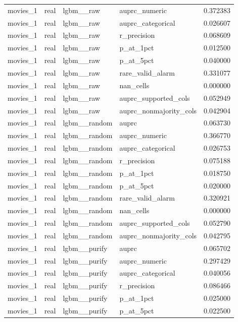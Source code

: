 \begin{tabular}{lllll}
movies\_1 & real & lgbm\_\_raw & auprc\_numeric & 0.372383 \\
movies\_1 & real & lgbm\_\_raw & auprc\_categorical & 0.026607 \\
movies\_1 & real & lgbm\_\_raw & r\_precision & 0.068609 \\
movies\_1 & real & lgbm\_\_raw & p\_at\_1pct & 0.012500 \\
movies\_1 & real & lgbm\_\_raw & p\_at\_5pct & 0.040000 \\
movies\_1 & real & lgbm\_\_raw & rare\_valid\_alarm & 0.331077 \\
movies\_1 & real & lgbm\_\_raw & nan\_cells & 0.000000 \\
movies\_1 & real & lgbm\_\_raw & auprc\_supported\_cols & 0.052949 \\
movies\_1 & real & lgbm\_\_raw & auprc\_nonmajority\_cols & 0.042904 \\
movies\_1 & real & lgbm\_\_random & auprc & 0.063730 \\
movies\_1 & real & lgbm\_\_random & auprc\_numeric & 0.366770 \\
movies\_1 & real & lgbm\_\_random & auprc\_categorical & 0.026753 \\
movies\_1 & real & lgbm\_\_random & r\_precision & 0.075188 \\
movies\_1 & real & lgbm\_\_random & p\_at\_1pct & 0.018750 \\
movies\_1 & real & lgbm\_\_random & p\_at\_5pct & 0.020000 \\
movies\_1 & real & lgbm\_\_random & rare\_valid\_alarm & 0.320921 \\
movies\_1 & real & lgbm\_\_random & nan\_cells & 0.000000 \\
movies\_1 & real & lgbm\_\_random & auprc\_supported\_cols & 0.052790 \\
movies\_1 & real & lgbm\_\_random & auprc\_nonmajority\_cols & 0.042795 \\
movies\_1 & real & lgbm\_\_purify & auprc & 0.065702 \\
movies\_1 & real & lgbm\_\_purify & auprc\_numeric & 0.297429 \\
movies\_1 & real & lgbm\_\_purify & auprc\_categorical & 0.040056 \\
movies\_1 & real & lgbm\_\_purify & r\_precision & 0.086466 \\
movies\_1 & real & lgbm\_\_purify & p\_at\_1pct & 0.025000 \\
movies\_1 & real & lgbm\_\_purify & p\_at\_5pct & 0.022500 \\

\end{tabular}
